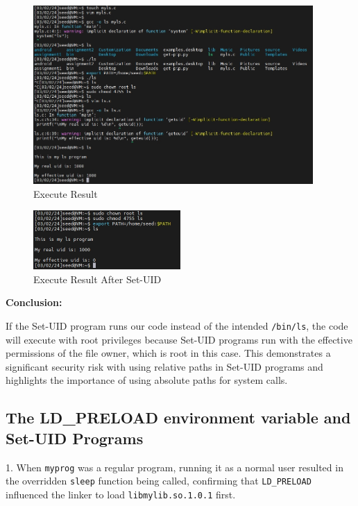 \documentclass[a4paper,11pt]{article}
\begin{document}
\begin{figure}[h]
    \centering
       \includegraphics[width=0.95\textwidth]{figures/task3/task3.png}
    \caption{Execute Result}\label{fig:task3}
\end{figure}
\begin{figure}[h]
    \centering
       \includegraphics[width=0.5\textwidth]{figures/task3/task3.1.png}
    \caption{Execute Result After Set-UID}\label{fig:task3.1}
\end{figure}

\textbf{Conclusion:}

If the Set-UID program runs our code instead of the intended \verb|/bin/ls|, the code will execute with root privileges because Set-UID programs run with the effective permissions of the file owner, which is root in this case. This demonstrates a significant security risk with using relative paths in Set-UID programs and highlights the importance of using absolute paths for system calls.

\subsection{The LD\_PRELOAD environment variable and Set-UID Programs}
1. When \verb|myprog| was a regular program, running it as a normal user resulted in the overridden \verb|sleep| function being called, confirming that \verb|LD_PRELOAD| influenced the linker to load \verb|libmylib.so.1.0.1| first.
\end{document}
